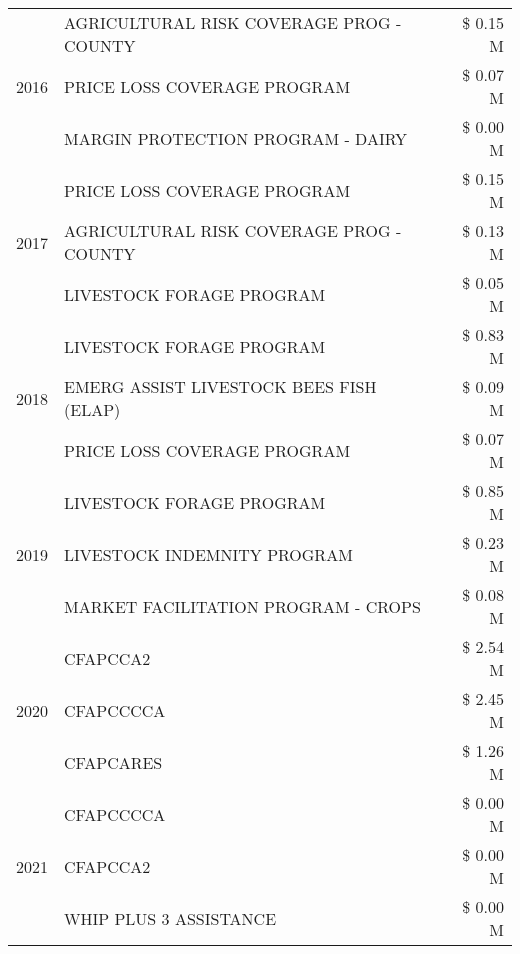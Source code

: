 \begin{tabular}{llr}
\multirow[t]{3}{*}{2016} & AGRICULTURAL RISK COVERAGE PROG - COUNTY & \$ 0.15 M \\
 & PRICE LOSS COVERAGE PROGRAM & \$ 0.07 M \\
 & MARGIN PROTECTION PROGRAM - DAIRY & \$ 0.00 M \\
\cline{1-3}
\multirow[t]{3}{*}{2017} & PRICE LOSS COVERAGE PROGRAM & \$ 0.15 M \\
 & AGRICULTURAL RISK COVERAGE PROG - COUNTY & \$ 0.13 M \\
 & LIVESTOCK FORAGE PROGRAM & \$ 0.05 M \\
\cline{1-3}
\multirow[t]{3}{*}{2018} & LIVESTOCK FORAGE PROGRAM & \$ 0.83 M \\
 & EMERG ASSIST LIVESTOCK BEES FISH (ELAP) & \$ 0.09 M \\
 & PRICE LOSS COVERAGE PROGRAM & \$ 0.07 M \\
\cline{1-3}
\multirow[t]{3}{*}{2019} & LIVESTOCK FORAGE PROGRAM & \$ 0.85 M \\
 & LIVESTOCK INDEMNITY PROGRAM & \$ 0.23 M \\
 & MARKET FACILITATION PROGRAM - CROPS & \$ 0.08 M \\
\cline{1-3}
\multirow[t]{3}{*}{2020} & CFAPCCA2 & \$ 2.54 M \\
 & CFAPCCCCA & \$ 2.45 M \\
 & CFAPCARES & \$ 1.26 M \\
\cline{1-3}
\multirow[t]{3}{*}{2021} & CFAPCCCCA & \$ 0.00 M \\
 & CFAPCCA2 & \$ 0.00 M \\
 & WHIP PLUS 3 ASSISTANCE & \$ 0.00 M \\
\cline{1-3}
\bottomrule
\end{tabular}

